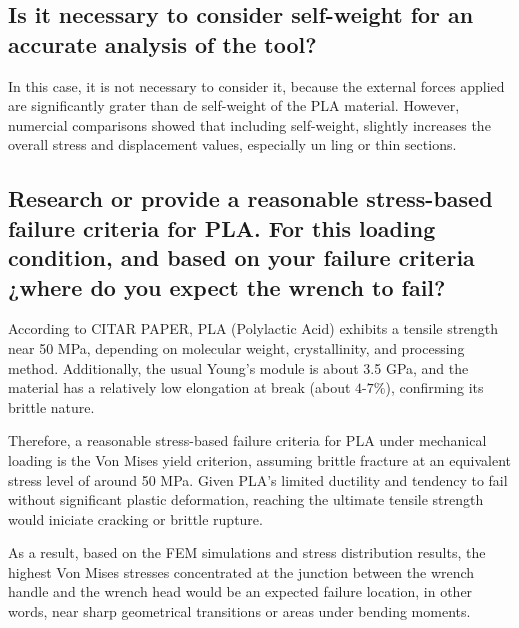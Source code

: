 \subsection{Is it necessary to consider self-weight for an accurate analysis of the tool?}

In this case, it is not necessary to consider it, because the external forces applied are significantly grater than de self-weight of the PLA material. 
However, numercial comparisons showed that including self-weight, slightly increases the overall stress and displacement values, especially un ling or thin sections.

\subsection{Research or provide a reasonable stress-based failure criteria for PLA. For this loading condition, and based on
your failure criteria ¿where do you expect the wrench to fail?}

According to CITAR PAPER, PLA (Polylactic Acid) exhibits a tensile strength near 50 MPa, depending on molecular weight, crystallinity, and processing method. Additionally, the usual Young's module is about 3.5 GPa, and the material has a relatively low elongation at break (about $4\text{-}7\%$), confirming its brittle nature.

Therefore, a reasonable stress-based failure criteria for PLA under mechanical loading is the Von Mises yield criterion, assuming brittle fracture at an equivalent stress level of around 50 MPa. Given PLA's limited ductility and tendency to fail without significant plastic deformation, reaching the ultimate tensile strength would iniciate cracking or brittle rupture.

As a result, based on the FEM simulations and stress distribution results, the highest Von Mises stresses concentrated at the junction between the wrench handle and the wrench head would be an expected failure location, in other words, near sharp geometrical transitions or areas under bending moments.











